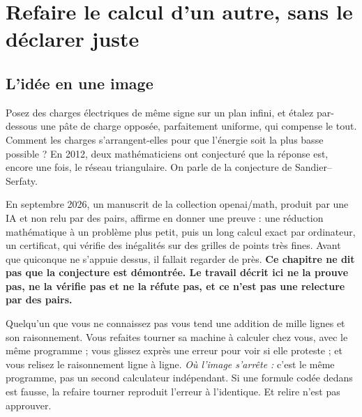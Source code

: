 \chapter[Refaire le calcul d'un autre]{Refaire le calcul d'un autre, sans le déclarer juste}


\section*{L'idée en une image}

Posez des charges électriques de même signe sur un plan infini, et étalez par-dessous une
\og pâte\fg{} de charge opposée, parfaitement uniforme, qui compense le tout. Comment les
charges s'arrangent-elles pour que l'énergie soit la plus basse possible ? En 2012, deux
mathématiciens ont conjecturé que la réponse est, encore une fois, le réseau triangulaire. On
parle de la conjecture de Sandier--Serfaty.

En septembre 2026, un manuscrit de la collection openai/math, produit par une IA et non relu
par des pairs, affirme en donner une preuve : une réduction mathématique à un problème plus
petit, puis un long calcul exact par ordinateur, un \og certificat\fg{}, qui vérifie des
inégalités sur des grilles de points très fines. Avant que
quiconque ne s'appuie dessus, il fallait regarder de près. \textbf{Ce chapitre ne dit pas que
la conjecture est démontrée. Le travail décrit ici ne la prouve pas, ne la vérifie pas et ne la
réfute pas, et ce n'est pas une relecture par des pairs.}

\begin{analogie}
Quelqu'un que vous ne connaissez pas vous tend une addition de mille lignes et son
raisonnement. Vous refaites tourner sa machine à calculer chez vous, avec le même programme ;
vous glissez exprès une erreur pour voir si elle proteste ; et vous relisez le raisonnement ligne
à ligne. \emph{Où l'image s'arrête :} c'est le même programme, pas un second calculateur
indépendant. Si une formule codée dedans est fausse, la refaire tourner reproduit l'erreur à
l'identique. Et relire n'est pas approuver.
\end{analogie}

